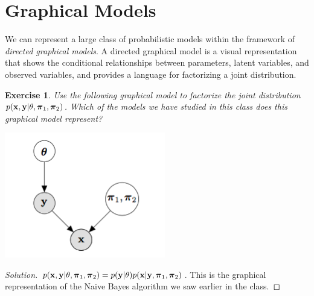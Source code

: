 \documentclass[12pt,letterpaper]{article}
\newtheorem{exercise}{Exercise}
\newenvironment{exercisesolution}
  {\begin{proof}[Solution]}
  {\end{proof}}
\begin{document}

\section{Graphical Models}
We can represent a large class of probabilistic models within the framework of \emph{directed graphical models}. A directed graphical model is a visual representation that shows the conditional relationships between parameters, latent variables, and observed variables, and provides a language for factorizing a joint distribution. 

\smallskip

\begin{exercise}
Use the following graphical model to factorize the joint distribution $p(\mathbf{x}, \mathbf{y} | \theta, \boldsymbol{\pi}_1, \boldsymbol{\pi}_2)$. Which of the models we have studied in this class does this graphical model represent? \\
\begin{center}
\includegraphics[width=7cm]{graphical_model}
\end{center}
\end{exercise}
\begin{exercisesolution}
$p(\mathbf{x}, \mathbf{y} | \theta, \boldsymbol{\pi}_1, \boldsymbol{\pi}_2) = p(\mathbf{y} | \theta)p(\mathbf{x} | \mathbf{y}, \boldsymbol{\pi}_1, \boldsymbol{\pi}_2) $. This is the graphical representation of the Naive Bayes algorithm we saw earlier in the class.

\end{exercisesolution}
\end{document}
